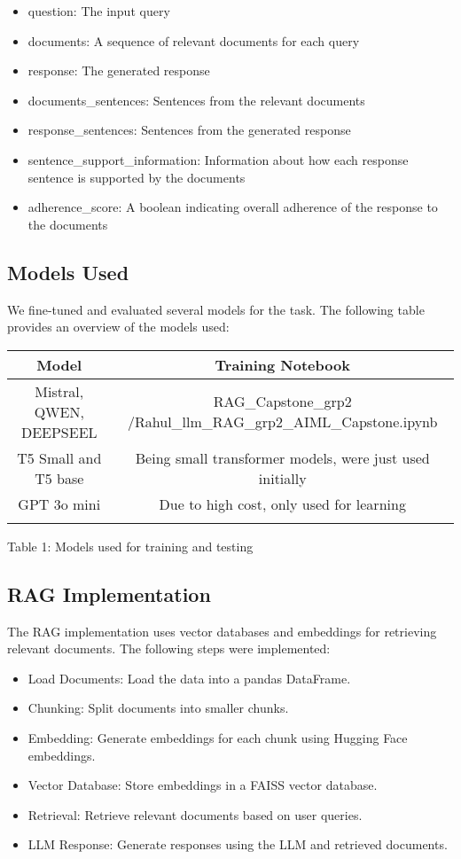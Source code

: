 \documentclass{article}
\begin{document}
\begin{itemize}
    \item question: The input query
    \item documents: A sequence of relevant documents for each query
    \item response: The generated response
    \item documents\_sentences: Sentences from the relevant documents
    \item response\_sentences: Sentences from the generated response
    \item sentence\_support\_information: Information about how each response sentence is supported by the documents
    \item adherence\_score: A boolean indicating overall adherence of the response to the documents
\end{itemize}
 

\subsection{Models Used}

We fine-tuned and evaluated several models for the task. The following table provides an overview of the models used:
\begin{center}
\begin{tabular}{|c|c|}
\hline
Model & Training Notebook \\
\hline
Mistral, QWEN, DEEPSEEL& RAG_Capstone_grp2
/Rahul_llm_RAG_grp2_AIML_Capstone.ipynb\\
T5 Small and T5 base& Being small transformer models, were just used initially\\
GPT 3o mini& Due to high cost, only used for learning\\
& \\
\hline
\end{tabular}
\end{center}

Table 1: Models used for training and testing


\subsection{RAG Implementation}

The RAG implementation uses vector databases and embeddings for retrieving relevant documents. The following steps were implemented:
\begin{itemize}
    \item Load Documents: Load the data into a pandas DataFrame.
    \item Chunking: Split documents into smaller chunks.
    \item Embedding: Generate embeddings for each chunk using Hugging Face embeddings.
    \item Vector Database: Store embeddings in a FAISS vector database.
    \item Retrieval: Retrieve relevant documents based on user queries.
    \item LLM Response: Generate responses using the LLM and retrieved documents.
\end{itemize}
\end{document}
